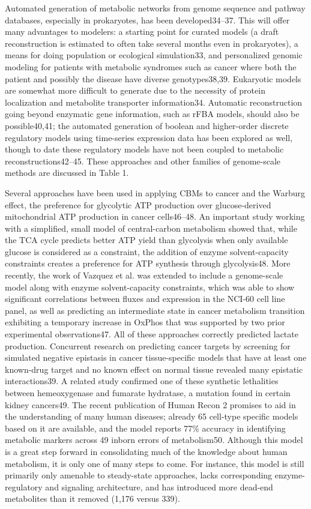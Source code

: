 \documentclass[phd,tocprelim]{cornell}
\begin{document}
Automated generation of metabolic networks from genome sequence and
pathway databases, especially in prokaryotes, has been developed34–37.
This will offer many advantages to modelers: a starting point for
curated models (a draft reconstruction is estimated to often take
several months even in prokaryotes), a means for doing population or
ecological simulation33, and personalized genomic modeling for
patients with metabolic syndromes such as cancer where both the
patient and possibly the disease have diverse genotypes38,39.
Eukaryotic models are somewhat more difficult to generate due to the
necessity of protein localization and metabolite transporter
information34. Automatic reconstruction going beyond enzymatic gene
information, such as rFBA models, should also be possible40,41; the
automated generation of boolean and higher-order discrete regulatory
models using time-series expression data has been explored as well,
though to date these regulatory models have not been coupled to
metabolic reconstructions42–45. These approaches and other families of
genome-scale methods are discussed in Table 1.

Several approaches have been used in applying CBMs to cancer and the
Warburg effect, the preference for glycolytic ATP production over
glucose-derived mitochondrial ATP production in cancer cells46–48. An
important study working with a simplified, small model of
central-carbon metabolism showed that, while the TCA cycle predicts
better ATP yield than glycolysis when only available glucose is
considered as a constraint, the addition of enzyme solvent-capacity
constraints creates a preference for ATP synthesis through
glycolysis48. More recently, the work of Vazquez et al. was extended
to include a genome-scale model along with enzyme solvent-capacity
constraints, which was able to show significant correlations between
fluxes and expression in the NCI-60 cell line panel, as well as
predicting an intermediate state in cancer metabolism transition
exhibiting a temporary increase in OxPhos that was supported by two
prior experimental observations47. All of these approaches correctly
predicted lactate production. Concurrent research on predicting cancer
targets by screening for simulated negative epistasis in cancer
tissue-specific models that have at least one known-drug target and no
known effect on normal tissue revealed many epistatic
interactions39. A related study confirmed one of these synthetic
lethalities between hemeoxygenase and fumarate hydratase, a mutation
found in certain kidney cancers49. The recent publication of Human
Recon 2 promises to aid in the understanding of many human diseases;
already 65 cell-type specific models based on it are available, and
the model reports 77\% accuracy in identifying metabolic markers
across 49 inborn errors of metabolism50. Although this model is a
great step forward in consolidating much of the knowledge about human
metabolism, it is only one of many steps to come. For instance, this
model is still primarily only amenable to steady-state approaches,
lacks corresponding enzyme-regulatory and signaling architecture, and
has introduced more dead-end metabolites than it removed (1,176 versus
339). 
\end{document}
